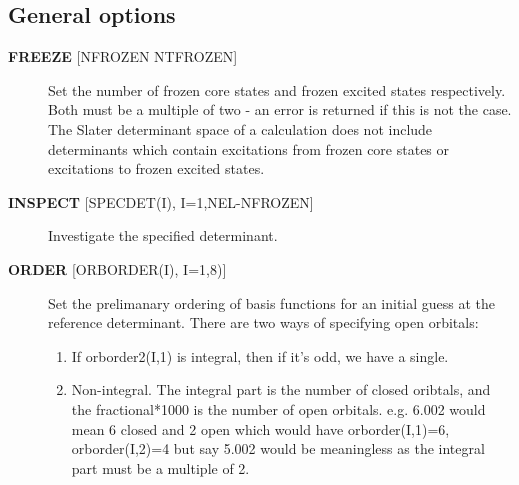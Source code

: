 \documentclass[openany,a4paper,10pt]{manual}
\begin{document}
\subsection{General options}
\begin{description}
\item[\textbf{FREEZE} {[}NFROZEN NTFROZEN{]}]
Set the number of frozen core states and frozen excited states
respectively.  Both must be a multiple of two - an error is returned
if this is not the case.  The Slater determinant space of a
calculation does not include determinants which contain excitations from
frozen core states or excitations to frozen excited states.

\item[\textbf{INSPECT} {[}SPECDET(I), I=1,NEL-NFROZEN{]}]
Investigate the specified determinant.

\item[\textbf{ORDER} {[}ORBORDER(I), I=1,8){]}]
Set the prelimanary ordering of basis functions for an initial guess
at the reference determinant.  There are two ways of specifying
open orbitals:
\begin{enumerate}
\item {} 
If orborder2(I,1) is integral, then if it's odd, we have a single.

\item {} 
Non-integral.  The integral part is the number of closed oribtals,
and the fractional*1000 is the number of open orbitals.
e.g. 6.002 would mean 6 closed and 2 open
which would have orborder(I,1)=6, orborder(I,2)=4
but say 5.002 would be meaningless as the integral part must be a
multiple of 2.

\end{enumerate}

\end{description}
\end{document}
